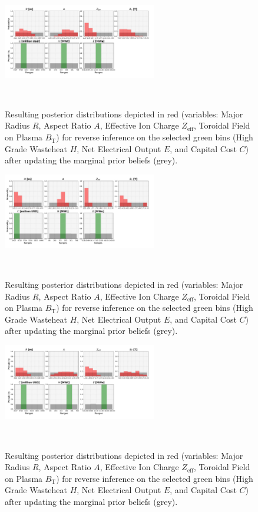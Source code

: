 \begin{figure}[ht]
    \centering
    \includegraphics[width=0.6\textwidth]{figures/TE_results/march_data/config(57)_3outputs_V2_2.png}
    \caption{Resulting posterior distributions depicted in red (variables: Major Radius $R$, Aspect Ratio $A$, Effective Ion Charge $Z_{\text{eff}}$, Toroidal Field on Plasma $B_{\text{T}}$) for reverse
    inference on the selected green bins (High Grade Wasteheat $H$, Net Electrical Output $E$, and  Capital Cost $C$) after updating the marginal prior beliefs (grey).}~\label{fig:config(57)_3outputs_V2_2}
\end{figure}

\begin{figure}[ht]
    \centering
    \includegraphics[width=0.6\textwidth]{figures/TE_results/march_data/config(57)_3outputs_V2_3.png}
    \caption{Resulting posterior distributions depicted in red (variables: Major Radius $R$, Aspect Ratio $A$, Effective Ion Charge $Z_{\text{eff}}$, Toroidal Field on Plasma $B_{\text{T}}$) for reverse
    inference on the selected green bins (High Grade Wasteheat $H$, Net Electrical Output $E$, and  Capital Cost $C$) after updating the marginal prior beliefs (grey).}~\label{fig:config(57)_3outputs_V2_3}
\end{figure}


\begin{figure}[ht]
    \centering
    \includegraphics[width=0.6\textwidth]{figures/TE_results/march_data/config(57)_3outputs_v2_5.png}
    \caption{Resulting posterior distributions depicted in red (variables: Major Radius $R$, Aspect Ratio $A$, Effective Ion Charge $Z_{\text{eff}}$, Toroidal Field on Plasma $B_{\text{T}}$) for reverse
    inference on the selected green bins (High Grade Wasteheat $H$, Net Electrical Output $E$, and  Capital Cost $C$) after updating the marginal prior beliefs (grey).}~\label{fig:config(57)_3outputs_V2_5}
\end{figure}

